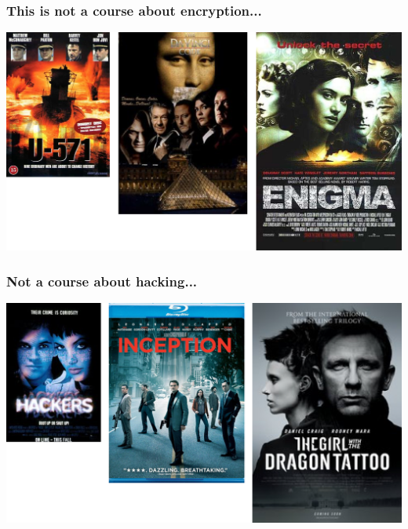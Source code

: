 \documentclass[10pt,handout]{beamer}
\begin{document}

\begin{frame}

\frametitle{This is not a course about encryption...}

\hspace*{-1.5em}
\includegraphics[width=1.1\textwidth]{crypto.png}

\end{frame}


\begin{frame}

\frametitle{Not a course about hacking...}

\hspace*{-1.5em}
\includegraphics[width=1.1\textwidth]{hacking.png}

\end{frame}

\end{document}
